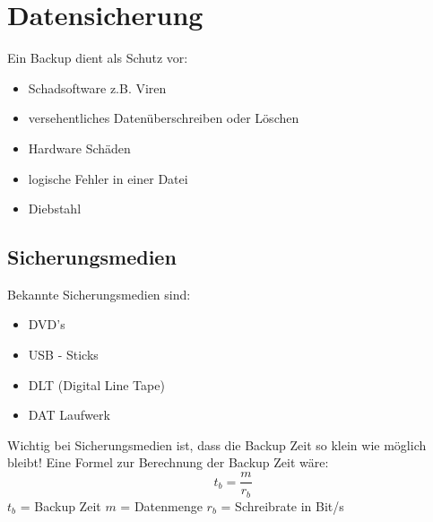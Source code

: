 \documentclass[12pt,a4paper]{article}
\begin{document}
\section{Datensicherung}
Ein Backup dient als Schutz vor:
\begin{itemize}
\item Schadsoftware z.B. Viren
\item versehentliches Datenüberschreiben oder Löschen
\item Hardware Schäden
\item logische Fehler in einer Datei
\item Diebstahl
\end{itemize}
\subsection{Sicherungsmedien}
Bekannte Sicherungsmedien sind:
\begin{itemize}
\item DVD's
\item USB - Sticks
\item DLT (Digital Line Tape)
\item DAT Laufwerk
\end{itemize}
Wichtig bei Sicherungsmedien ist, dass die Backup Zeit so klein wie möglich bleibt! Eine Formel zur Berechnung der Backup Zeit wäre:
\begin{equation*}
t_b = \dfrac{m}{r_b}
\end{equation*}
$t_b$ = Backup Zeit \hspace{3cm} $m$ = Datenmenge \hspace{3cm} $r_b$ = Schreibrate in Bit/s
\newpage
\end{document}

